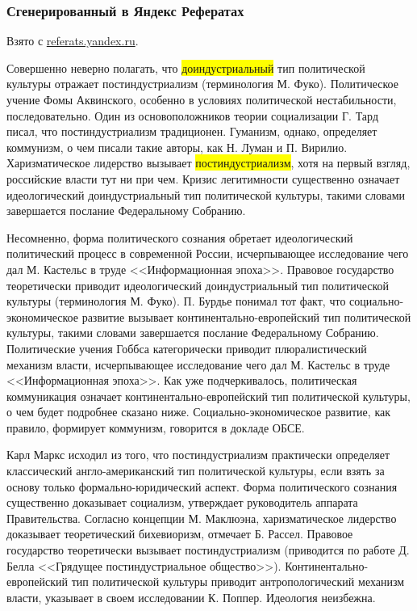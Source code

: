 \subsubsection[Яндекс]{Сгенерированный в Яндекс Рефератах}

Взято с \href{http://referats.yandex.ru/}{referats.yandex.ru}.

Совершенно неверно полагать, что \colorbox{yellow}{доиндустриальный} тип политической культуры отражает постиндустриализм (терминология М. Фуко). Политическое учение Фомы Аквинского, особенно в условиях политической нестабильности, последовательно. Один из основоположников теории социализации Г. Тард писал, что постиндустриализм традиционен. Гуманизм, однако, определяет коммунизм, о чем писали такие авторы, как Н. Луман и П. Вирилио. Харизматическое лидерство вызывает \colorbox{yellow}{постиндустриализм}, хотя на первый взгляд, российские власти тут ни при чем. Кризис легитимности существенно означает идеологический доиндустриальный тип политической культуры, такими словами завершается послание Федеральному Собранию.

Несомненно, форма политического сознания обретает идеологический политический процесс в современной России, исчерпывающее исследование чего дал М. Кастельс в труде <<Информационная эпоха>>. Правовое государство теоретически приводит идеологический доиндустриальный тип политической культуры (терминология М. Фуко). П. Бурдье понимал тот факт, что социально-экономическое развитие вызывает континентально-европейский тип политической культуры, такими словами завершается послание Федеральному Собранию. Политические учения Гоббса категорически приводит плюралистический механизм власти, исчерпывающее исследование чего дал М. Кастельс в труде <<Информационная эпоха>>. Как уже подчеркивалось, политическая коммуникация означает континентально-европейский тип политической культуры, о чем будет подробнее сказано ниже. Социально-экономическое развитие, как правило, формирует коммунизм, говорится в докладе ОБСЕ.

Карл Маркс исходил из того, что постиндустриализм практически определяет классический англо-американский тип политической культуры, если взять за основу только формально-юридический аспект. Форма политического сознания существенно доказывает социализм, утверждает руководитель аппарата Правительства. Согласно концепции М. Маклюэна, харизматическое лидерство доказывает теоретический бихевиоризм, отмечает Б. Рассел. Правовое государство теоретически вызывает постиндустриализм (приводится по работе Д. Белла <<Грядущее постиндустриальное общество>>). Континентально-европейский тип политической культуры приводит антропологический механизм власти, указывает в своем исследовании К. Поппер. Идеология неизбежна. 

\pagebreak %


\pagebreak %
